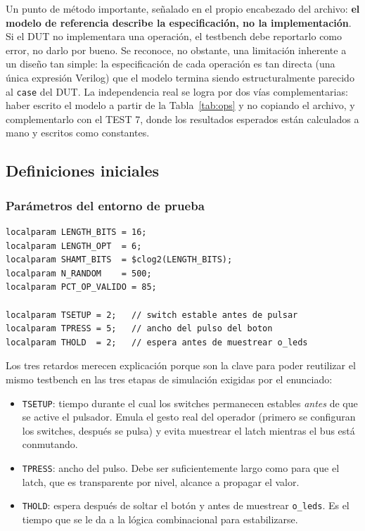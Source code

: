 \documentclass[12pt,a4paper]{article}
\begin{document}
Un punto de método importante, señalado en el propio encabezado del archivo:
\textbf{el modelo de referencia describe la especificación, no la
implementación}. Si el DUT no implementara una operación, el testbench debe
reportarlo como error, no darlo por bueno. Se reconoce, no obstante, una
limitación inherente a un diseño tan simple: la especificación de cada
operación es tan directa (una única expresión Verilog) que el modelo termina
siendo estructuralmente parecido al \texttt{case} del DUT. La independencia real
se logra por dos vías complementarias: haber escrito el modelo a partir de la
Tabla~\ref{tab:ops} y no copiando el archivo, y complementarlo con el TEST 7,
donde los resultados esperados están calculados a mano y escritos como
constantes.

\subsection{Definiciones iniciales}

\subsubsection{Parámetros del entorno de prueba}

\begin{lstlisting}[caption={Parámetros del testbench.}]
localparam LENGTH_BITS = 16;
localparam LENGTH_OPT  = 6;
localparam SHAMT_BITS  = $clog2(LENGTH_BITS);
localparam N_RANDOM    = 500;
localparam PCT_OP_VALIDO = 85;

localparam TSETUP = 2;   // switch estable antes de pulsar
localparam TPRESS = 5;   // ancho del pulso del boton
localparam THOLD  = 2;   // espera antes de muestrear o_leds
\end{lstlisting}

Los tres retardos merecen explicación porque son la clave para poder reutilizar
el mismo testbench en las tres etapas de simulación exigidas por el enunciado:

\begin{itemize}[leftmargin=2em,itemsep=0.2em]
  \item \texttt{TSETUP}: tiempo durante el cual los switches permanecen estables
        \emph{antes} de que se active el pulsador. Emula el gesto real del
        operador (primero se configuran los switches, después se pulsa) y evita
        muestrear el latch mientras el bus está conmutando.
  \item \texttt{TPRESS}: ancho del pulso. Debe ser suficientemente largo como
        para que el latch, que es transparente por nivel, alcance a propagar el
        valor.
  \item \texttt{THOLD}: espera después de soltar el botón y antes de muestrear
        \texttt{o\_leds}. Es el tiempo que se le da a la lógica combinacional
        para estabilizarse.
\end{itemize}
\end{document}
